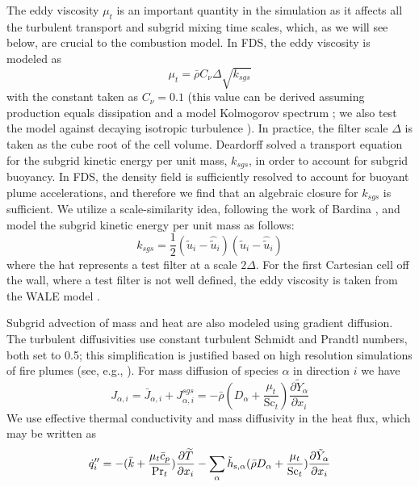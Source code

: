 \documentclass[journal,article,atmosphere,submit,moreauthors,pdftex]{Definitions/mdpi}
\begin{document}
The eddy viscosity $\mu_t$ is an important quantity in the simulation as it affects all the turbulent transport and subgrid mixing time scales, which, as we will see below, are crucial to the combustion model.  In FDS, the eddy viscosity is modeled as \cite{Pope:2000,Deardorff:1980}
\begin{equation}
\mu_t = \bar{\rho} C_\nu \Delta \sqrt{k_{sgs}}
\end{equation}
with the constant taken as $C_\nu = 0.1$ (this value can be derived assuming production equals dissipation and a model Kolmogorov spectrum \cite{Pope:2000}; we also test the model against decaying isotropic turbulence \cite{CBC}).  In practice, the filter scale $\Delta$ is taken as the cube root of the cell volume.  Deardorff \cite{Deardorff:1980} solved a transport equation for the subgrid kinetic energy per unit mass, $k_{sgs}$, in order to account for subgrid buoyancy. In FDS, the density field is sufficiently resolved to account for buoyant plume accelerations, and therefore we find that an algebraic closure for $k_{sgs}$ is sufficient.  We utilize a scale-similarity idea, following the work of Bardina \cite{Bardina:1980}, and model the subgrid kinetic energy per unit mass as follows:
\begin{equation}
k_{sgs} = \frac{1}{2}(\tilde{u}_i - \hat{\tilde{u}}_i)(\tilde{u}_i - \hat{\tilde{u}}_i)
\end{equation}
where the hat represents a test filter at a scale $2\Delta$.  For the first Cartesian cell off the wall, where a test filter is not well defined, the eddy viscosity is taken from the WALE model \cite{Nicoud:1999}.

Subgrid advection of mass and heat are also modeled using gradient diffusion.  The turbulent diffusivities use constant turbulent Schmidt and Prandtl numbers, both set to 0.5; this simplification is justified based on high resolution simulations of fire plumes (see, e.g., \cite{Maragkos:2020}). For mass diffusion of species $\alpha$ in direction $i$ we have
\begin{equation}
J_{\alpha,i} = \bar{J}_{\alpha,i} + J_{\alpha,i}^{sgs} = -\bar{\rho}(D_\alpha + \frac{\mu_t}{\mathrm{Sc}_t}) \frac{\partial \tilde{Y}_\alpha}{\partial x_i}
\end{equation}
We use effective thermal conductivity and mass diffusivity in the heat flux, which may be written as
\begin{equation}
{\dot{q}''}_i = -(\bar{k} + \frac{\mu_t \bar{c}_p}{\mathrm{Pr}_t}) \frac{\partial \widetilde{T}}{\partial x_i} - \sum_\alpha \tilde{h}_{{\rm s},\alpha} ( \bar{\rho} D_\alpha + \frac{\mu_t}{\mathrm{Sc}_t} ) \frac{\partial \tilde{Y}_\alpha }{\partial x_i}
\end{equation}
\end{document}
